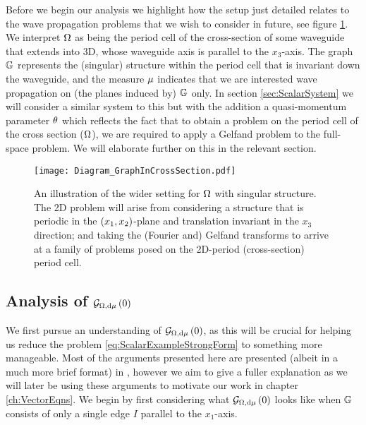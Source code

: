 Before we begin our analysis we highlight how the setup just detailed relates to the wave propagation problems that we wish to consider in future, see figure \ref{fig:ScalarStrucDiagram}.
We interpret $\Omega$ as being the period cell of the cross-section of some waveguide that extends into 3D, whose waveguide axis is parallel to the $x_3$-axis.
The graph $\mathbb{G}$ represents the (singular) structure within the period cell that is invariant down the waveguide, and the measure $\mu$ indicates that we are interested wave propagation on (the planes induced by) $\mathbb{G}$ only.
In section \ref{sec:ScalarSystem} we will consider a similar system to this but with the addition a quasi-momentum parameter $\theta$ which reflects the fact that to obtain a problem on the period cell of the cross section ($\Omega$), we are required to apply a Gelfand problem to the full-space problem.
We will elaborate further on this in the relevant section.
\begin{figure}[h!]
	\centering
	\texttt{[image: Diagram\_GraphInCrossSection.pdf]}
	\caption{\label{fig:ScalarStrucDiagram} An illustration of the wider setting for $\Omega$ with singular structure. The 2D problem will arise from considering a structure that is periodic in the $\left( x_1,x_2 \right)$-plane and translation invariant in the $x_3$ direction; and taking the (Fourier and) Gelfand transforms to arrive at a family of problems posed on the 2D-period (cross-section) period cell.}
\end{figure}

\subsection{Analysis of $\mathcal{G}_{ \Omega, \mathrm{d}\mu}\left( 0 \right)$}
We first pursue an understanding of $\mathcal{G}_{ \Omega, \mathrm{d}\mu}\left( 0 \right)$, as this will be crucial for helping us reduce the problem \eqref{eq:ScalarExampleStrongForm} to something more manageable.
Most of the arguments presented here are presented (albeit in a much more brief format) in \cite{zhikov2000extension}, however we aim to give a fuller explanation as we will later be using these arguments to motivate our work in chapter \ref{ch:VectorEqns}.
We begin by first considering what $\mathcal{G}_{ \Omega, \mathrm{d}\mu}\left( 0 \right)$ looks like when $\mathbb{G}$ consists of only a single edge $I$ parallel to the $x_1$-axis.

